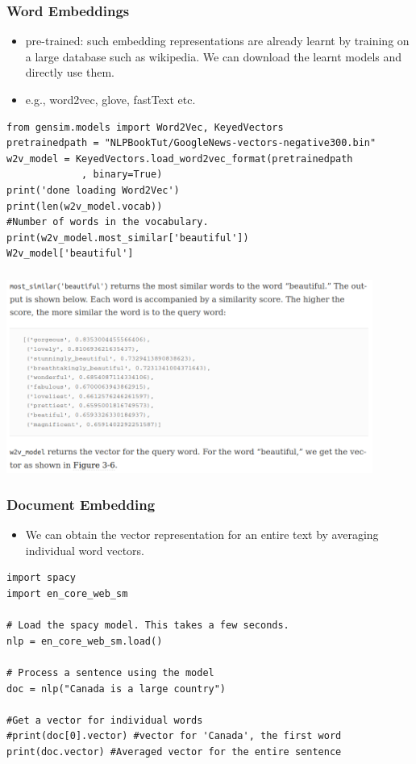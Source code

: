 \documentclass{beamer}
\begin{document}
\begin{frame}[fragile]
\frametitle{Word Embeddings}
\begin{itemize}
\item pre-trained: such embedding representations are already learnt by training on a large database such as wikipedia. We can download the learnt models and directly use them.
\item e.g., word2vec, glove, fastText etc. 
\end{itemize} \tiny
\begin{verbatim}
from gensim.models import Word2Vec, KeyedVectors
pretrainedpath = "NLPBookTut/GoogleNews-vectors-negative300.bin"
w2v_model = KeyedVectors.load_word2vec_format(pretrainedpath
             , binary=True)
print('done loading Word2Vec')
print(len(w2v_model.vocab)) 
#Number of words in the vocabulary.
print(w2v_model.most_similar['beautiful'])
W2v_model['beautiful']
\end{verbatim}
\end{frame}

\begin{frame}
\frametitle{}
\includegraphics[width=0.9\textwidth]{figures/beautiful.png}
\end{frame}

\begin{frame}[fragile]
\frametitle{Document Embedding}
\begin{itemize}
\item We can obtain the vector representation for an entire text by averaging individual word vectors.
\end{itemize} \tiny
\begin{verbatim}
import spacy
import en_core_web_sm

# Load the spacy model. This takes a few seconds.
nlp = en_core_web_sm.load()

# Process a sentence using the model
doc = nlp("Canada is a large country")

#Get a vector for individual words
#print(doc[0].vector) #vector for 'Canada', the first word 
print(doc.vector) #Averaged vector for the entire sentence
\end{verbatim}
\end{frame}
\end{document}

